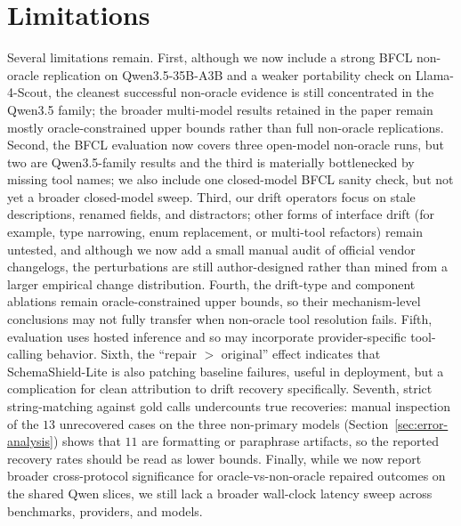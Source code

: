 \documentclass{svproc}
\newcommand{\method}{SchemaShield-Lite\xspace}
\begin{document}
\section{Limitations}
\label{sec:limitations}
Several limitations remain. First, although we now include a strong BFCL
non-oracle replication on Qwen3.5-35B-A3B and a weaker portability check on
Llama-4-Scout, the cleanest successful non-oracle evidence is still concentrated
in the Qwen3.5 family; the broader multi-model results retained in the paper
remain mostly oracle-constrained upper bounds rather than full non-oracle
replications. Second, the BFCL evaluation now covers three open-model non-oracle
runs, but two are Qwen3.5-family results and the third is materially bottlenecked
by missing tool names; we also include one closed-model BFCL sanity check, but
not yet a broader closed-model sweep. Third, our drift operators focus on stale
descriptions, renamed fields, and distractors; other forms of interface drift
(for example, type narrowing, enum replacement, or multi-tool refactors) remain
untested, and although we now add a small manual audit of official vendor
changelogs, the perturbations are still author-designed rather than mined from a
larger empirical change distribution. Fourth, the drift-type and component ablations remain
oracle-constrained upper bounds, so their mechanism-level conclusions may not fully
transfer when non-oracle tool resolution fails. Fifth, evaluation uses hosted
inference and so may incorporate provider-specific tool-calling behavior. Sixth, the ``repair $>$ original''
effect indicates that \method is also patching baseline failures, useful in
deployment, but a complication for clean attribution to drift recovery
specifically. Seventh, strict string-matching against gold calls undercounts true
recoveries: manual inspection of the $13$ unrecovered cases on the three
non-primary models (Section~\ref{sec:error-analysis}) shows that $11$ are
formatting or paraphrase artifacts, so the reported recovery rates should be
read as lower bounds. Finally, while we now report broader cross-protocol
significance for oracle-vs-non-oracle repaired outcomes on the shared Qwen slices,
we still lack a broader wall-clock latency sweep across benchmarks, providers, and
models.
\end{document}
